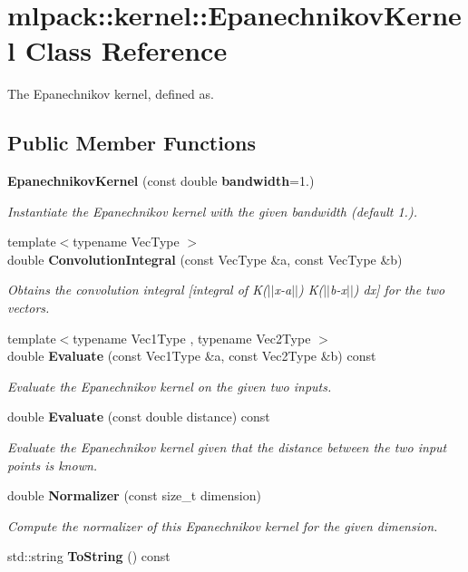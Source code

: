 \section{mlpack\-:\-:kernel\-:\-:Epanechnikov\-Kernel Class Reference}
\label{classmlpack_1_1kernel_1_1EpanechnikovKernel}


The Epanechnikov kernel, defined as.  


\subsection*{Public Member Functions}
\begin{DoxyCompactItemize}
\item 
{\bf Epanechnikov\-Kernel} (const double {\bf bandwidth}=1.)
\begin{DoxyCompactList}\small\item\em Instantiate the Epanechnikov kernel with the given bandwidth (default 1.). \end{DoxyCompactList}\item 
{\footnotesize template$<$typename Vec\-Type $>$ }\\double {\bf Convolution\-Integral} (const Vec\-Type \&a, const Vec\-Type \&b)
\begin{DoxyCompactList}\small\item\em Obtains the convolution integral [integral of K($\vert$$\vert$x-\/a$\vert$$\vert$) K($\vert$$\vert$b-\/x$\vert$$\vert$) dx] for the two vectors. \end{DoxyCompactList}\item 
{\footnotesize template$<$typename Vec1\-Type , typename Vec2\-Type $>$ }\\double {\bf Evaluate} (const Vec1\-Type \&a, const Vec2\-Type \&b) const 
\begin{DoxyCompactList}\small\item\em Evaluate the Epanechnikov kernel on the given two inputs. \end{DoxyCompactList}\item 
double {\bf Evaluate} (const double distance) const 
\begin{DoxyCompactList}\small\item\em Evaluate the Epanechnikov kernel given that the distance between the two input points is known. \end{DoxyCompactList}\item 
double {\bf Normalizer} (const size\-\_\-t dimension)
\begin{DoxyCompactList}\small\item\em Compute the normalizer of this Epanechnikov kernel for the given dimension. \end{DoxyCompactList}\item 
std\-::string {\bf To\-String} () const 
\end{DoxyCompactItemize}
